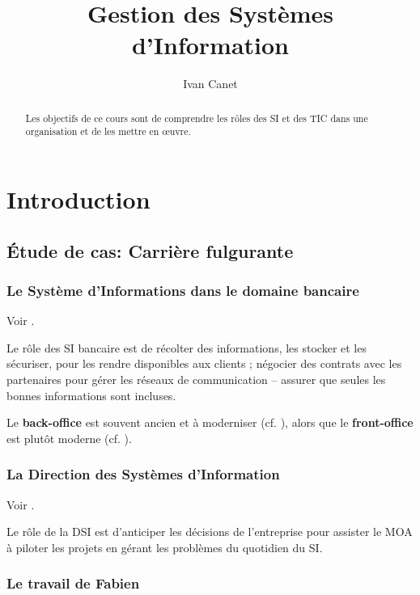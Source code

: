 \documentclass[10pt,a4paper,french]{article}
\begin{document}
\title{Gestion des Systèmes d'Information}
\author{Ivan Canet}
\maketitle

\begin{abstract}
Les objectifs de ce cours sont de comprendre les rôles des SI et des TIC dans une organisation et de les mettre en œuvre.
\end{abstract}
\tableofcontents

\section{Introduction}

\subsection{Étude de cas: Carrière fulgurante}

\subsubsection{Le Système d'Informations dans le domaine bancaire}

Voir .

Le rôle des SI bancaire est de récolter des informations, les stocker et les sécuriser, pour les rendre disponibles aux clients ; négocier des contrats avec les partenaires pour gérer les réseaux de communication -- assurer que seules les bonnes informations sont incluses.

Le \textbf{back-office} est souvent ancien et à moderniser (cf. ), alors que le \textbf{front-office} est plutôt moderne (cf. ).

\subsubsection{La Direction des Systèmes d'Information}

Voir .

Le rôle de la DSI est d'anticiper les décisions de l'entreprise pour assister le MOA à piloter les projets en gérant les problèmes du quotidien du SI.

\subsubsection{Le travail de Fabien}
\end{document}
